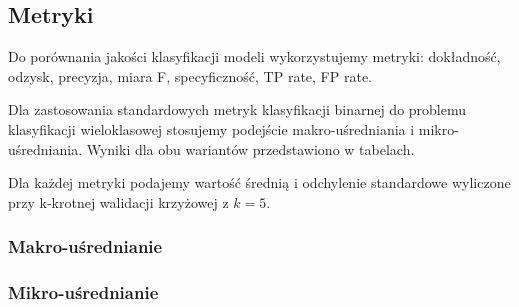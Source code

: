 \documentclass{article}
\begin{document}
\newpage
\subsection*{Metryki}
Do porównania jakości klasyfikacji modeli wykorzystujemy metryki:
dokładność, odzysk, precyzja, miara F, specyficzność, TP rate, FP rate.

Dla zastosowania standardowych metryk klasyfikacji binarnej do problemu klasyfikacji wieloklasowej stosujemy
podejście makro-uśredniania i mikro-uśredniania. Wyniki dla obu wariantów przedstawiono w tabelach.

Dla każdej metryki podajemy wartość średnią i odchylenie standardowe wyliczone przy
k-krotnej walidacji krzyżowej z $k=5$.


\subsubsection*{Makro-uśrednianie}
\begin{table}[h!]
    \centering
    \begin{adjustbox}{valign=c, width=\textwidth}
    \end{adjustbox}
    \label{tab:metrics-macro-1}
\end{table}

\begin{table}[h!]
    \centering
    \begin{adjustbox}{valign=c, width=\textwidth}
    \end{adjustbox}
    \label{tab:metrics-macro-2}
\end{table}

\subsubsection*{Mikro-uśrednianie}

\begin{table}[h!]
    \centering
    \begin{adjustbox}{valign=c, width=\textwidth}
    \end{adjustbox}
    \label{tab:metrics-micro-1}
\end{table}

\begin{table}[h!]
    \centering
    \begin{adjustbox}{valign=c, width=\textwidth}
    \end{adjustbox}
    \label{tab:metrics-micro-2}
\end{table}
\end{document}
